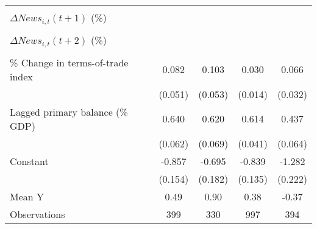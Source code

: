 {\begin{tabular}{l*{4}{c}}
                    &                     &                     &                     &                     \\
\addlinespace
$ \Delta News_{i,t}(t+1)$ (\%)&                     &                     &                     &                     \\
                    &                     &                     &                     &                     \\
\addlinespace
$ \Delta News_{i,t}(t+2)$ (\%)&                     &                     &                     &                     \\
                    &                     &                     &                     &                     \\
\addlinespace
\% Change in terms-of-trade index&       0.082         &       0.103\sym{*}  &       0.030\sym{**} &       0.066\sym{**} \\
                    &     (0.051)         &     (0.053)         &     (0.014)         &     (0.032)         \\
\addlinespace
Lagged primary balance (\% GDP)&       0.640\sym{***}&       0.620\sym{***}&       0.614\sym{***}&       0.437\sym{***}\\
                    &     (0.062)         &     (0.069)         &     (0.041)         &     (0.064)         \\
\addlinespace
Constant            &      -0.857\sym{***}&      -0.695\sym{***}&      -0.839\sym{***}&      -1.282\sym{***}\\
                    &     (0.154)         &     (0.182)         &     (0.135)         &     (0.222)         \\
\midrule
Mean Y              &        0.49         &        0.90         &        0.38         &       -0.37         \\
Observations        &         399         &         330         &         997         &         394         \\
\bottomrule
\end{tabular}
}
